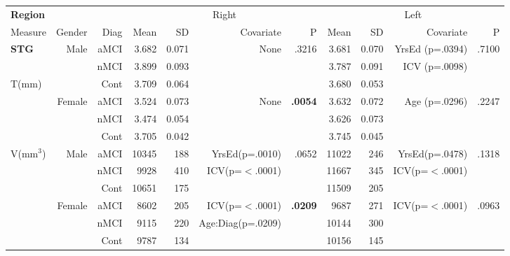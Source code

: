 \documentclass[12pt]{article}
\newcommand\T{\rule{0pt}{2.6ex}}
\newcommand\B{\rule[-1.2ex]{0pt}{0pt}}
\begin{document}
\newpage
\begin{sidewaystable}
	\centering
	\footnotesize
	\begin{tabular}{l|rr|rrrr|rrrr}
	\hline
	\textbf{Region} & & & \multicolumn{4}{c}{Right} \T & \multicolumn{4}{|c}{Left} \\
	\multicolumn{1}{l|}{Measure} \T\B & Gender & Diag & Mean & SD & Covariate & P & Mean & SD & Covariate & P \\
	\hline\hline
	\textbf{STG} \T & \multirow{3}{*}{Male} & aMCI & 3.682 & 0.071 & None & .3216 & 3.681 & 0.070	 & YrsEd (p=.0394) & .7100 \\
							&						& nMCI & 3.899 & 0.093  & &  & 3.787 & 0.091  & ICV (p=.0098)		& \\
	\multirow{2}{*}{T(mm)}						&						& Cont & 3.709 & 0.064  & & & 3.680 &  0.053 & & \\\cline{2-11}
							&	\multirow{3}{*}{Female}	& aMCI\T & 3.524 & 0.073 & None & \textbf{.0054} & 3.632 &0.072  & Age (p=.0296) & .2247 \\
							&						& nMCI & 3.474 & 0.054  & & & 3.626 & 0.073 & & \\
							&						& Cont & 3.705 & 0.042  & & & 3.745 &0.045  & & \\						
	\hline
	\multirow{6}{*}{V(mm$^3$)} \T & \multirow{3}{*}{Male} & aMCI\T & 10345 &188 & YrsEd(p=.0010) & .0652 & 11022	& 246	& YrsEd(p=.0478) & .1318 \\
							&						& nMCI &9928 &410  & ICV(p=$<$.0001)& & 11667&345 & ICV(p=$<$.0001) & \\
							&						& Cont &10651 &175  & 		& &11509&205 & & \\\cline{2-11}
							&	\multirow{3}{*}{Female}	& aMCI\T &8602	 & 205 & ICV(p=$<$.0001) & \textbf{.0209} & 9687&271 & ICV(p=$<$.0001) & .0963 \\
							&						& nMCI &9115 & 220 & Age:Diag(p=.0209) & & 10144 & 300 & 		& \\
							&						& Cont &9787 &134  & & & 10156 & 145	& 		&  \\


\end{tabular}
\end{sidewaystable}
\end{document}
